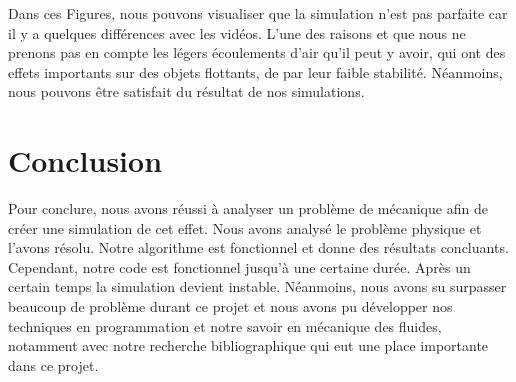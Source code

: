     Dans ces Figures, nous pouvons visualiser que la simulation n'est pas parfaite car il y a quelques différences avec les vidéos. L'une des raisons et que nous ne prenons pas en compte les légers écoulements d'air qu'il peut y avoir, qui ont des effets importants sur des objets flottants, de par leur faible stabilité. Néanmoins, nous pouvons être satisfait du résultat de nos simulations.
    
\twocolumn
\section*{Conclusion}
    Pour conclure, nous avons réussi à analyser un problème de mécanique afin de créer une simulation de cet effet. Nous avons analysé le problème physique et l'avons résolu. Notre algorithme est fonctionnel et donne des résultats concluants. Cependant, notre code est fonctionnel jusqu'à une certaine durée. Après un certain temps la simulation devient instable. Néanmoins, nous avons su surpasser beaucoup de problème durant ce projet et nous avons pu développer nos techniques en programmation et notre savoir en mécanique des fluides, notamment avec notre recherche bibliographique qui eut une place importante dans ce projet. 
